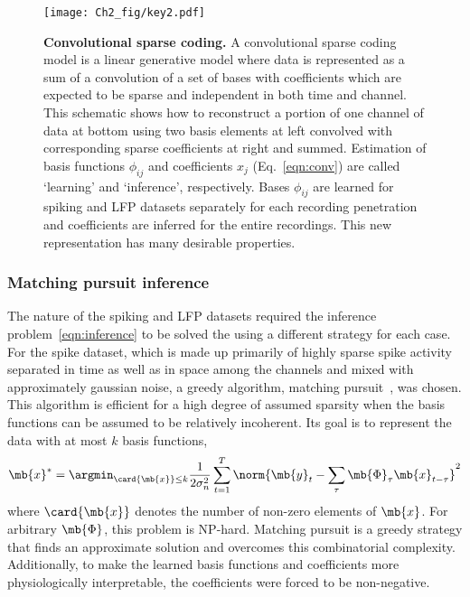 \begin{figure}[ht!]
  \centering
  \texttt{[image: Ch2\_fig/key2.pdf]}
  \caption{\textbf{Convolutional sparse coding.} A convolutional
    sparse coding model is a linear generative model where data is
    represented as a sum of a convolution of a set of bases with
    coefficients which are expected to be sparse and independent in
    both time and channel. This schematic shows how to reconstruct a
    portion of one channel of data at bottom using two basis elements
    at left convolved with corresponding sparse coefficients at right
    and summed. Estimation of basis functions $\phi_{ij}$ and
    coefficients $x_j$ (Eq.~\ref{eqn:conv}) are called
    `learning' and `inference', respectively. Bases $\phi_{ij}$ are
    learned for spiking and LFP datasets separately for each recording
    penetration and coefficients are inferred for the entire
    recordings. This new representation has many desirable
    properties.}
  \label{fig:sparseconvolution}
\end{figure}

\subsubsection{Matching pursuit inference}

The nature of the spiking and LFP datasets required the inference
problem~\ref{eqn:inference} to be solved the using a different
strategy for each case. For the spike dataset, which is made up
primarily of highly sparse spike activity separated in time as well as
in space among the channels and mixed with approximately gaussian
noise, a greedy algorithm, matching
pursuit~\cite{mallat1993matching,olshausen2003learning,Smith:2006qf},
was chosen. This algorithm is efficient for a high degree of assumed
sparsity when the basis functions can be assumed to be relatively
incoherent. Its goal is to represent the data with at most $k$ basis
functions,
\begin{align*}
  \mb{x}^* = \argmin_{\card{\mb{x}} \le k} \frac{1}{2 \sigma_n^2}
  \sum_{t=1}^T \norm{\mb{y}_t - \sum_\tau \mb{\Phi}_\tau
    \mb{x}_{t-\tau}}^2
\end{align*}
where $\card{\mb{x}}$ denotes the number of non-zero elements of
$\mb{x}$. For arbitrary $\mb{\Phi}$, this problem is
NP-hard\cite{davis1997adaptive}. Matching pursuit is a greedy strategy
that finds an approximate solution and overcomes this combinatorial
complexity. Additionally, to make the learned basis functions and
coefficients more physiologically interpretable, the coefficients were
forced to be non-negative.

